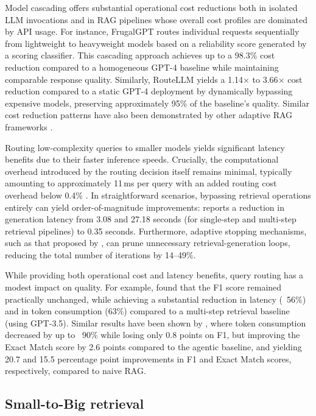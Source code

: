 Model cascading offers substantial operational cost reductions both in isolated LLM invocations and in RAG pipelines whose overall cost profiles are dominated by API usage. For instance, FrugalGPT \cite{chen2023frugalgpt} routes individual requests sequentially from lightweight to heavyweight models based on a reliability score generated by a scoring classifier. This cascading approach achieves up to a 98.3\% cost reduction compared to a homogeneous GPT-4 baseline while maintaining comparable response quality. Similarly, RouteLLM \cite{ong2025routellm} yields a 1.14$\times$ to 3.66$\times$ cost reduction compared to a static GPT-4 deployment by dynamically bypassing expensive models, preserving approximately 95\% of the baseline's quality. Similar cost reduction patterns have also been demonstrated by other adaptive RAG frameworks \cite{jeong2024adaptive, guo2026deepsieve}.

Routing low-complexity queries to smaller models yields significant latency benefits due to their faster inference speeds. Crucially, the computational overhead introduced by the routing decision itself remains minimal, typically amounting to approximately 11\,ms per query \cite{zhang2025ragrouter} with an added routing cost overhead below 0.4\% \cite{ong2025routellm}. In straightforward scenarios, bypassing retrieval operations entirely can yield order-of-magnitude improvements: \citet{jeong2024adaptive} reports a reduction in generation latency from 3.08 and 27.18 seconds (for single-step and multi-step retrieval pipelines) to 0.35 seconds. Furthermore, adaptive stopping mechanisms, such as that proposed by \citet{park2025stoprag}, can prune unnecessary retrieval-generation loops, reducing the total number of iterations by 14--49\%. 

While providing both operational cost and latency benefits, query routing has a modest impact on quality. For example, \citet{jeong2024adaptive} found that the F1 score remained practically unchanged, while achieving a substantial reduction in latency (~56\%) and in token consumption (63\%) compared to a multi-step retrieval baseline (using GPT-3.5). Similar results have been shown by \citet{guo2026deepsieve}, where token consumption decreased by up to ~90\% while losing only 0.8 points on F1, but improving the Exact Match score by 2.6 points compared to the agentic baseline, and yielding 20.7 and 15.5 percentage point improvements in F1 and Exact Match scores, respectively, compared to naive RAG.

\subsection{Small-to-Big retrieval}
\label{lit:retrieval}

